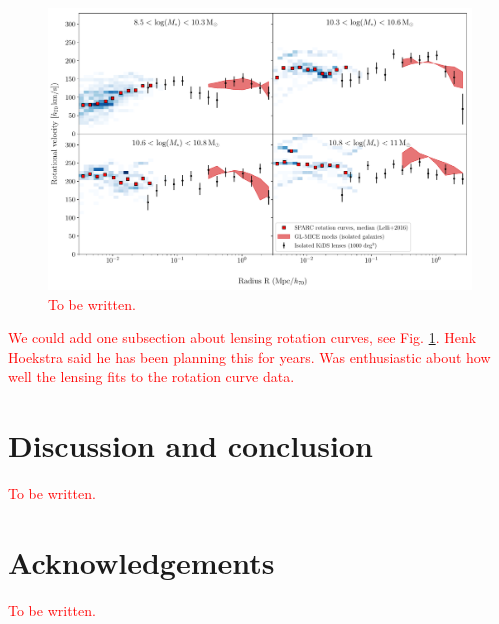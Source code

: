 \documentclass[usenatbib]{mnras}
\begin{document}
\begin{figure}
	\includegraphics[width=\textwidth]{Figures/ESD_KiDS_MICE_mstarbins_iso.pdf}
	\caption{\textcolor{red}{To be written.}}
	\label{fig:rot_curve}
\end{figure}

\textcolor{red}{We could add one subsection about lensing rotation curves, see Fig. \ref{fig:rot_curve}. Henk Hoekstra said he has been planning this for years. Was enthusiastic about how well the lensing fits to the rotation curve data.}

\section{Discussion and conclusion}
\label{sec:discon}

\textcolor{red}{To be written.}

\section*{Acknowledgements}
\textcolor{red}{To be written.}
\end{document}
